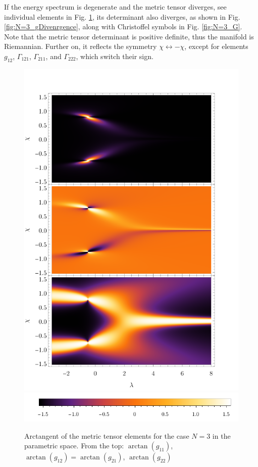 If the energy spectrum is degenerate and the metric tensor diverges, see individual elements in Fig. \ref{fig:N=3_g}, its determinant also diverges, as shown in Fig. \ref{fig:N=3_gDivenrgence}, along with Christoffel symbols in Fig. \ref{fig:N=3_G}. Note that the metric tensor determinant is positive definite, thus the manifold is Riemannian. Further on, it reflects the symmetry $\chi\leftrightarrow-\chi$, except for elements $g_{12}$, $\Gamma_{121}$, $\Gamma_{211}$, and $\Gamma_{222}$, which switch their sign.
\begin{figure}[H]
    \centering
    \includegraphics[scale=1.3]{../img/N=3_gComponents.pdf}
    \includegraphics[scale=1.3]{../img/N=3_barA.pdf}
    \caption{Arctangent of the metric tensor elements for the case $N=3$ in the parametric space. From the top: $\arctan(g_{11})$, $\arctan(g_{12})=\arctan(g_{21})$, $\arctan(g_{22})$}
    \label{fig:N=3_g}
\end{figure}


